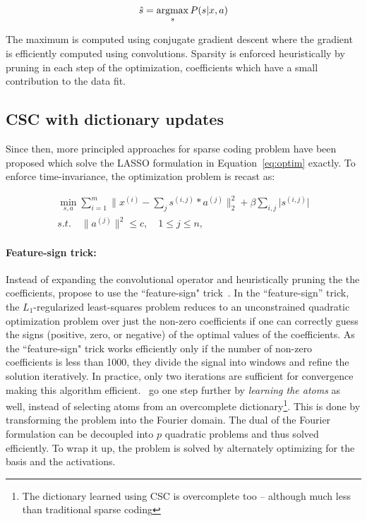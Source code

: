 \begin{equation}
\hat{s} = \mathop{\mathrm{argmax}}_{s} P(s|x,a)
\end{equation}

The maximum is computed using conjugate gradient descent where the gradient is efficiently computed using convolutions. Sparsity is enforced heuristically by  pruning in each step of the optimization, coefficients which have a small contribution to the data fit. 

\subsection{CSC with dictionary updates}

Since then, more principled approaches for sparse coding problem have been proposed which solve the LASSO formulation in Equation~\ref{eq:optim} exactly. To enforce time-invariance, the optimization problem is recast as:

\begin{eqnarray}
\min_{s, a} \sum_{i=1}^{m} \|x^{(i)} - \sum_{j} s^{(i, j)} * a^{(j)} \|_{2}^{2} + \beta \sum_{i,j} \lvert s^{(i,j)} \rvert \\
s.t. \quad \| a^{(j)} \|^{2} \leq c, \quad 1 \leq j \leq n,
\end{eqnarray}
\label{eq:conv_optim}

\paragraph{Feature-sign trick:} Instead of expanding the convolutional operator and heuristically pruning the the coefficients, \citet{grosse2012shift} propose to use the ``feature-sign" trick~\citep{lee2006efficient}. In the ``feature-sign'' trick, the $L_{1}$-regularized least-squares problem reduces to an unconstrained quadratic optimization problem over just the non-zero coefficients if one can correctly guess the signs (positive, zero, or negative) of the optimal values of the coefficients. As the ``feature-sign" trick works efficiently only if the number of non-zero coefficients is less than 1000, they divide the signal into windows and refine the solution iteratively. In practice, only two iterations are sufficient for convergence making this algorithm efficient.~\citet{grosse2012shift} go one step further by \textit{learning the atoms} as well, instead of selecting atoms from an overcomplete dictionary\footnote{The dictionary learned using CSC is overcomplete too -- although much less than traditional sparse coding}. This is done by transforming the problem into the Fourier domain. The dual of the Fourier formulation can be decoupled into $p$ quadratic problems and thus solved efficiently. To wrap it up, the problem is solved by alternately optimizing for the basis and the activations. 

